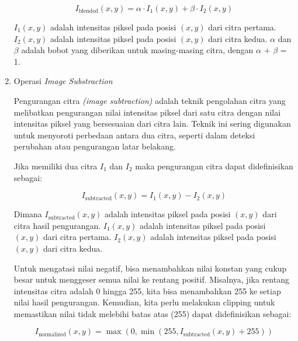 \begin{enumerate}[leftmargin=1cm, itemindent=0.6cm,labelwidth=15pt, labelsep=5pt, listparindent=1cm,align=left]
    \begin{equation}
        I_{\text{blended}}(x, y) = \alpha \cdot I_1(x, y) + \beta \cdot I_2(x, y)
    \end{equation}

\(I_1(x, y)\) adalah intensitas piksel pada posisi \((x,y)\) dari citra pertama. \(I_2(x, y)\) adalah intensitas piksel pada posisi \((x,y)\) dari citra kedua. \(\alpha\) dan \(\beta\) adalah bobot yang diberikan untuk masing-masing citra, dengan \(\alpha\) + \(\beta\) = 1.


	\item Operasi \textit{Image Substraction}

        Pengurangan citra \textit{(image subtraction)} adalah teknik pengolahan citra yang melibatkan pengurangan nilai intensitas piksel dari satu citra dengan nilai intensitas piksel yang bersesuaian dari citra lain. Teknik ini sering digunakan untuk menyoroti perbedaan antara dua citra, seperti dalam deteksi perubahan atau pengurangan latar belakang.

Jika memiliki dua citra \(I_1\) dan \(I_2\) maka pengurangan citra dapat didefinisikan sebagai:

        \begin{equation}
            I_{\text{subtracted}}(x, y) = I_1(x, y) - I_2(x, y)
        \end{equation}

Dimana \(I_{\text{subtracted}}(x, y)\) adalah intensitas piksel pada posisi \((x,y)\) dari citra hasil pengurangan. \(I_1(x,y)\) adalah intensitas piksel pada posisi \((x,y)\) dari citra pertama. \(I_2(x,y)\) adalah intensitas piksel pada posisi \((x,y)\) dari citra kedua.

Untuk mengatasi nilai negatif, bisa menambahkan nilai konstan yang cukup besar untuk menggeser semua nilai ke rentang positif. Misalnya, jika rentang intensitas citra adalah 0 hingga 255, kita bisa menambahkan 255 ke setiap nilai hasil pengurangan. Kemudian, kita perlu melakukan clipping untuk memastikan nilai tidak melebihi batas atas (255) dapat didefinisikan sebagai:

        \begin{equation}
            I_{\text{normalized}}(x, y) = \max(0, \min(255, I_{\text{subtracted}}(x, y) + 255))
        \end{equation}


\end{enumerate}
